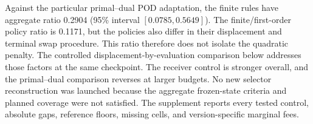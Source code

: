 Against the particular primal--dual POD adaptation, the finite rules have aggregate ratio 0.2904 (95\% interval $[0.0785,0.5649]$). The finite/first-order policy ratio is 0.1171, but the policies also differ in their displacement and terminal swap procedure. This ratio therefore does not isolate the quadratic penalty. The controlled displacement-by-evaluation comparison below addresses those factors at the same checkpoint. The receiver control is stronger overall, and the primal--dual comparison reverses at larger budgets. No new selector reconstruction was launched because the aggregate frozen-state criteria and planned coverage were not satisfied. The supplement reports every tested control, absolute gaps, reference floors, missing cells, and version-specific marginal fees.
